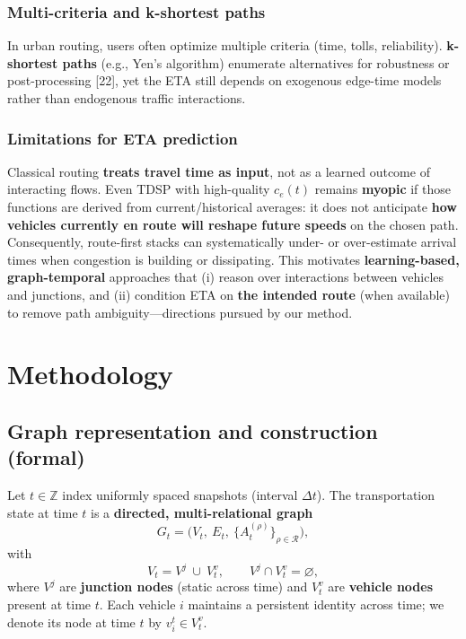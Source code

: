 \documentclass[
  10pt,
  letterpaper,
  lettersize,
  journal]{IEEEtran}
\begin{document}
\subsubsection{Multi-criteria and k-shortest
paths}\label{multi-criteria-and-k-shortest-paths}

In urban routing, users often optimize multiple criteria (time, tolls,
reliability). \textbf{k-shortest paths} (e.g., Yen's algorithm)
enumerate alternatives for robustness or post-processing {[}22{]}, yet
the ETA still depends on exogenous edge-time models rather than
endogenous traffic interactions.

\subsubsection{Limitations for ETA
prediction}\label{limitations-for-eta-prediction}

Classical routing \textbf{treats travel time as input}, not as a learned
outcome of interacting flows. Even TDSP with high-quality \(c_e(t)\)
remains \textbf{myopic} if those functions are derived from
current/historical averages: it does not anticipate \textbf{how vehicles
currently en route will reshape future speeds} on the chosen path.
Consequently, route-first stacks can systematically under- or
over-estimate arrival times when congestion is building or dissipating.
This motivates \textbf{learning-based, graph-temporal} approaches that
(i) reason over interactions between vehicles and junctions, and (ii)
condition ETA on \textbf{the intended route} (when available) to remove
path ambiguity---directions pursued by our method.

\section{Methodology}\label{methodology}

\subsection{Graph representation and construction
(formal)}\label{graph-representation-and-construction-formal}

Let \(t\in\mathbb{Z}\) index uniformly spaced snapshots (interval
\(\Delta t\)). The transportation state at time \(t\) is a
\textbf{directed, multi-relational graph}
\[G_t=\big(V_t,\ E_t,\ \{A_t^{(\rho)}\}_{\rho\in\mathcal{R}}\big),\]
with \[V_t=V^{j}\ \cup\ V_t^{v},\qquad V^{j}\cap V_t^{v}=\varnothing,\]
where \(V^{j}\) are \textbf{junction nodes} (static across time) and
\(V_t^{v}\) are \textbf{vehicle nodes} present at time \(t\). Each
vehicle \(i\) maintains a persistent identity across time; we denote its
node at time \(t\) by \(v_i^{t}\in V_t^{v}\).
\end{document}

